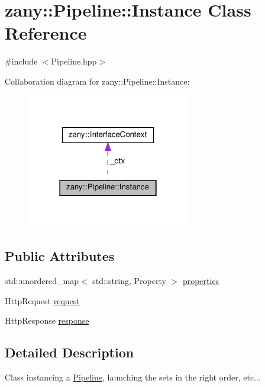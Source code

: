 \hypertarget{classzany_1_1_pipeline_1_1_instance}{}\section{zany\+:\+:Pipeline\+:\+:Instance Class Reference}
\label{classzany_1_1_pipeline_1_1_instance}


{\ttfamily \#include $<$Pipeline.\+hpp$>$}



Collaboration diagram for zany\+:\+:Pipeline\+:\+:Instance\+:\nopagebreak
\begin{figure}[H]
\begin{center}
\leavevmode
\includegraphics[width=202pt]{classzany_1_1_pipeline_1_1_instance__coll__graph}
\end{center}
\end{figure}
\subsection*{Public Attributes}
\begin{DoxyCompactItemize}
\item 
std\+::unordered\+\_\+map$<$ std\+::string, Property $>$ \hyperlink{classzany_1_1_pipeline_1_1_instance_a98f29b395ee9292ce50d9d3665ad0713}{properties}
\item 
Http\+Request \hyperlink{classzany_1_1_pipeline_1_1_instance_a1df80a693d2b107e79c7630fbc13209a}{request}
\item 
Http\+Response \hyperlink{classzany_1_1_pipeline_1_1_instance_a85b0d65a24356836b8ff33b4bec9eeca}{response}
\end{DoxyCompactItemize}


\subsection{Detailed Description}
Class instancing a \hyperlink{classzany_1_1_pipeline}{Pipeline}, launching the sets in the right order, etc... 

